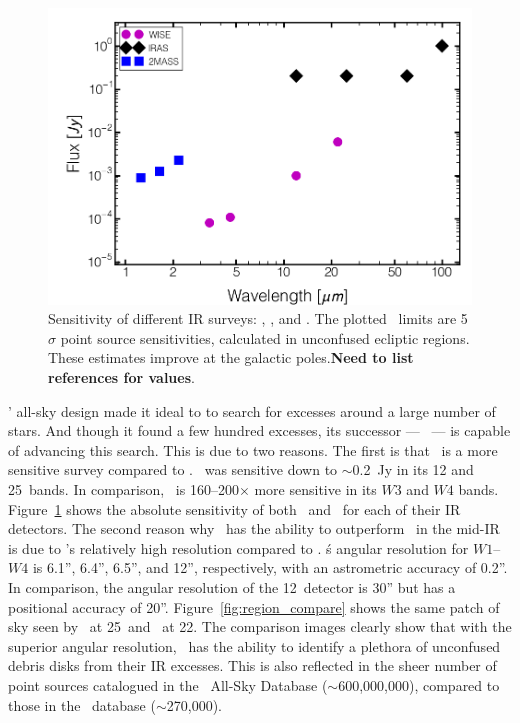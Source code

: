     
    \begin{figure}
    \centering
    \includegraphics[width=\textwidth]{Ch2/flux_density_comparison}
    \caption[All-sky IR Sensitivities]{Sensitivity of different IR surveys: \WS, \iras, and \mass. The plotted \WS\ limits are 5$\sigma$ point source sensitivities, calculated in unconfused ecliptic regions. These estimates improve at the galactic poles.\textbf{Need to list references for values}.}
    \label{fig:flux_comparison}
    \end{figure}
    

    
    \iras' all-sky design made it ideal to to search for excesses around a large number of stars. And though it found a few hundred excesses, its successor --- \WS\ --- is capable of advancing this search. This is due to two reasons. The first is that \WS\ is a more sensitive survey compared to \iras. \iras\ was sensitive down to $\sim$0.2~Jy in its 12 and 25\micron\ bands. In comparison, \WS\ is 160--200$\times$ more sensitive in its $W3$ and $W4$ bands. Figure~\ref{fig:flux_comparison} shows the absolute sensitivity of both \iras\ and \WS\ for each of their IR detectors. The second reason why \WS\ has the ability to outperform \iras\ in the mid-IR is due to \WS's relatively high resolution compared to \iras. \WS\'s angular resolution for $W1$--$W4$ is 6.1'', 6.4'', 6.5'', and 12'', respectively, with an astrometric accuracy of 0.2''. In comparison, the angular resolution of the 12\micron\ detector is 30'' but has a positional accuracy of 20''. Figure~\ref{fig:region_compare} shows the same patch of sky seen by \iras\ at 25\micron\ and \WS\ at 22\micron. The comparison images clearly show that with the superior angular resolution, \WS\ has the ability to identify a plethora of unconfused debris disks from their IR excesses. This is also reflected in the sheer number of point sources catalogued in the \WS\ All-Sky Database ($\sim$600,000,000), compared to those in the \iras\ database ($\sim$270,000). 
    
